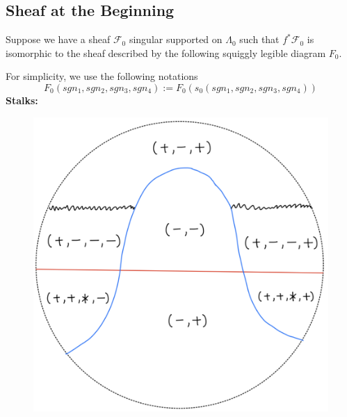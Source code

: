 \subsection*{Sheaf at the Beginning}
Suppose we have a sheaf $\mathscr{F}_0$ singular supported on $\Lambda_0$ such that $f^*\mathscr{F}_0$ is isomorphic to the sheaf described by the following squiggly legible diagram $F_0$.

For simplicity, we use the following notations
\[
F_0(sgn_1,sgn_2,sgn_3,sgn_4):=F_0(s_0(sgn_1,sgn_2,sgn_3,sgn_4))
\]
\textbf{Stalks:}
\begin{figure}[H]
    \centering
    \includegraphics[scale = 0.45]{diagrams/lemma2/27.png} 
    \caption{}
    \label{fig:your-label}
\end{figure}
